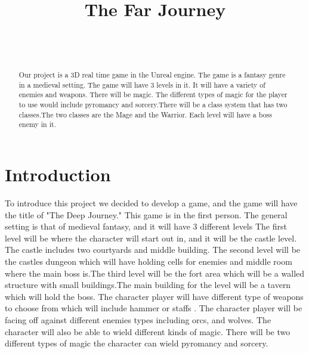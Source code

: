 \documentclass{sigchi}
\def\plaintitle{The Far Journey}
\begin{document}
\title{\plaintitle}

\author{%
  \\
  \\
  }

\maketitle

\begin{abstract}
 Our project is a 3D real time game in the Unreal engine. 
  The game is a fantasy genre in a medieval setting. The game will have 3 levels in it.
  It will have a variety of enemies and weapons. There will be magic. The different types of magic for the player to use would include pyromancy and sorcery.There will be a class system that has two classes.The two classes are the Mage and the Warrior. Each level will have a boss enemy in it.
   \end{abstract}



\section{Introduction}
To introduce this project we decided to develop a game, and  the game will have the title of  "The Deep Journey." This game is in the first person. The general setting is that of medieval fantasy, and it will have 3 different levels  The first level will be where the character will start out in, and it will be the castle level. The castle  includes two  courtyards and middle building. The second level will be the castles dungeon which will have holding cells for enemies and middle room where the main boss is.The third level will be the fort  area which will be a walled structure with small buildings.The main building for the level will be a tavern which will hold the boss. The character player will have different type of weapons to choose from which will include hammer or staffs . The character player will be facing off against different enemies types including orcs, and wolves.  The character will also be able to wield different kinds of magic. There will be two different types of magic the character can wield pyromancy and sorcery.  
\end{document}
